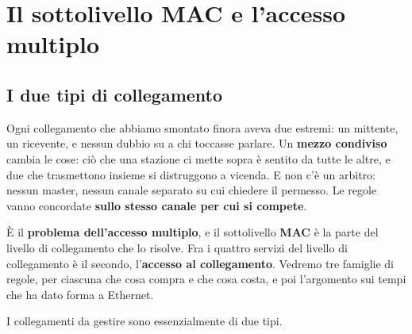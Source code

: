 \chapter{Il sottolivello MAC e l'accesso multiplo}

\section{I due tipi di collegamento}

Ogni collegamento che abbiamo smontato finora aveva due estremi: un mittente, un ricevente, e nessun dubbio su a chi toccasse
parlare. Un \textbf{mezzo condiviso} cambia le cose: ciò che una stazione ci mette sopra è sentito da tutte le altre, e due che
trasmettono insieme si distruggono a vicenda. E non c'è un arbitro: nessun master, nessun canale separato su cui chiedere il
permesso. Le regole vanno concordate \textbf{sullo stesso canale per cui si compete}.

È il \textbf{problema dell'accesso multiplo}, e il sottolivello \textbf{MAC} è la parte del livello di collegamento che lo risolve. Fra
i quattro servizi del livello di collegamento è il secondo, l'\textbf{accesso al collegamento}. Vedremo tre famiglie di regole, per
ciascuna che cosa compra e che cosa costa, e poi l'argomento sui tempi che ha dato forma a Ethernet.

I collegamenti da gestire sono essenzialmente di due tipi.


